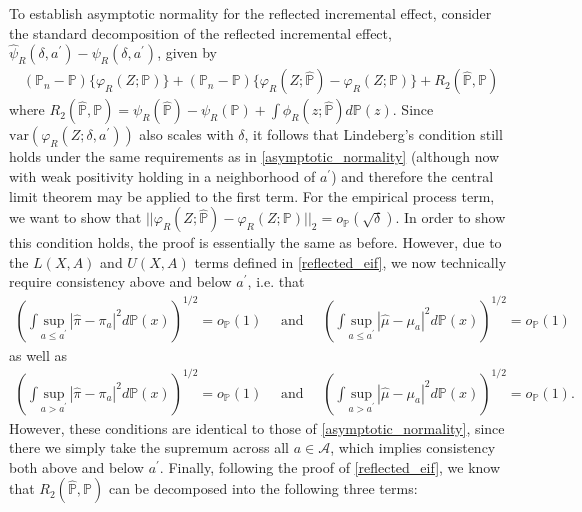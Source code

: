 \documentclass[11pt,twoside]{article}
\newcommand{\var}{\text{var}}
\theoremstyle{definition}
\theoremstyle{remark}
\begin{document}
To establish asymptotic normality for the reflected incremental effect, consider the standard decomposition of the reflected incremental effect, $\widehat{\psi}_R(\delta, a^\prime) - \psi_R(\delta, a^\prime)$, given by
\begin{align*}
     (\mathbb{P}_n - \mathbb{P})\{\varphi_R(Z; \mathbb{P})\} + (\mathbb{P}_n - \mathbb{P})\{\varphi_R(Z; \widehat{\mathbb{P}}) - \varphi_R(Z; \mathbb{P})\} + R_2(\widehat{\mathbb{P}}, \mathbb{P}) 
\end{align*}
where $R_2(\widehat{\mathbb{P}}, \mathbb{P}) = \psi_R(\widehat{\mathbb{P}}) - \psi_R(\mathbb{P}) + \int \phi_R(z; \widehat{\mathbb{P}}) d\mathbb{P}(z)$. Since $\var(\varphi_R(Z;\delta, a^\prime))$ also scales with $\delta$, it follows that Lindeberg's condition still holds under the same requirements as in \cref{asymptotic_normality} (although now with weak positivity holding in a neighborhood of $a^\prime$) and therefore the central limit theorem may be applied to the first term. For the empirical process term, we want to show that $||\varphi_R(Z; \widehat{\mathbb{P}}) - \varphi_R(Z; \mathbb{P})||_2 = o_\mathbb{P}(\sqrt{\delta})$. In order to show this condition holds, the proof is essentially the same as before. However, due to the $L(X, A)$ and $U(X, A)$ terms defined in \cref{reflected_eif}, we now technically require consistency above and below $a^\prime$, i.e. that
\begin{align*}
    \left( \int \underset{a \leq a^\prime}{\text{sup}} \, | \widehat{\pi} - \pi_a|^2 d\mathbb{P}(x) \right)^{1/2} = o_{\mathbb{P}}(1) \quad \text{ and } \quad  \left( \int \underset{a \leq a^\prime}{\text{sup}} \, | \widehat{\mu} - \mu_a|^2 d\mathbb{P}(x) \right)^{1/2} = o_{\mathbb{P}}(1)
\end{align*}
as well as 
\begin{align*}
    \left( \int \underset{a > a^\prime}{\text{sup}} \, | \widehat{\pi} - \pi_a|^2 d\mathbb{P}(x) \right)^{1/2} = o_{\mathbb{P}}(1) \quad \text{ and } \quad  \left( \int \underset{a > a^\prime}{\text{sup}} \, | \widehat{\mu} - \mu_a|^2 d\mathbb{P}(x) \right)^{1/2} = o_{\mathbb{P}}(1).
\end{align*}
However, these conditions are identical to those of \cref{asymptotic_normality}, since there we simply take the supremum across all $a \in \mathcal{A}$, which implies consistency both above and below $a^\prime$. Finally, following the proof of \cref{reflected_eif}, we know that $R_2(\widehat{\mathbb{P}}, \mathbb{P})$ can be decomposed into the following three terms:
\end{document}
